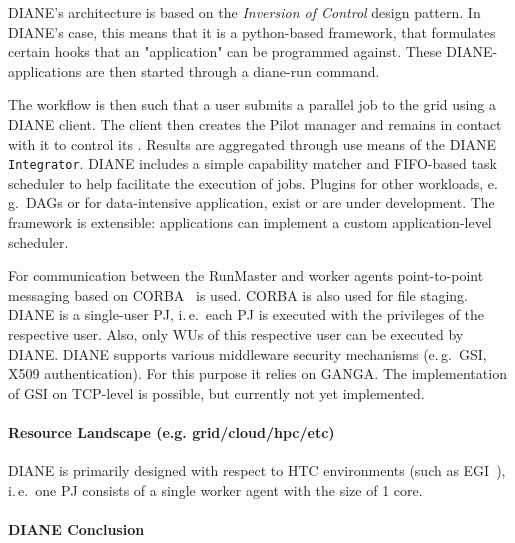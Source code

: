\documentclass{sig-alternate}
\begin{document}
DIANE's architecture is based on the \textit{Inversion of Control} design pattern.
In DIANE's case, this means that it is a python-based framework, that
formulates certain hooks that an "application" can be programmed against.
These DIANE-applications are then started through a diane-run command.

The workflow is then such that a user submits a parallel job to
the grid using a DIANE client.  The client then creates the Pilot manager
and remains in contact with it to control its \pilotjobs.  Results
are aggregated through use means of the DIANE
\texttt{Integrator}.
DIANE includes a simple capability matcher and FIFO-based task scheduler
to help facilitate the execution of jobs.
Plugins for other workloads, e.\,g.\ DAGs or for data-intensive
application, exist or are under development. The framework is extensible:
applications can implement a custom application-level scheduler.

For communication between the RunMaster and
worker agents point-to-point messaging based on CORBA~\cite{OMG-CORBA303:2004}
is used. CORBA is also used for file staging.
DIANE is a single-user PJ, i.\,e.\ each PJ is executed with the
privileges of the respective user. Also, only WUs of this respective user can be
executed by DIANE. DIANE supports various middleware security mechanisms
(e.\,g.\ GSI, X509 authentication). For this purpose it relies on GANGA. The
implementation of GSI on TCP-level is possible, but currently not yet
implemented. 


\paragraph{Resource Landscape (e.g. grid/cloud/hpc/etc)}

DIANE is primarily designed with respect to HTC environments (such as
EGI~\cite{egi}), i.\,e.\ one PJ consists of a single worker agent with the
size of 1 core.

\paragraph{DIANE Conclusion}




\end{document}
